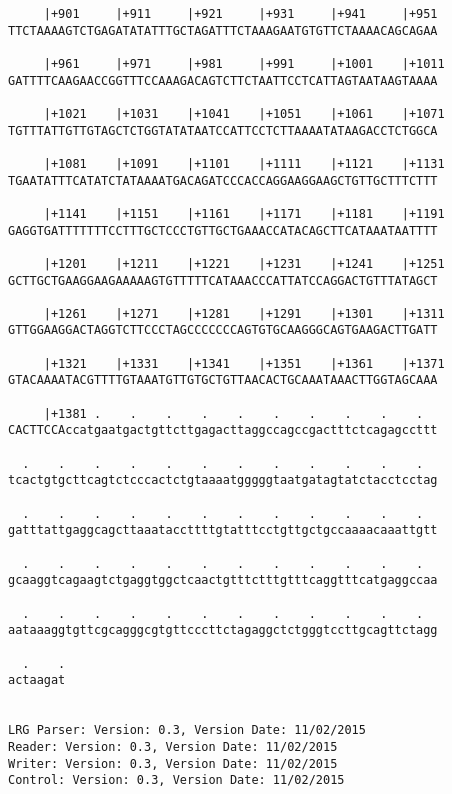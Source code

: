 \documentclass{article}
\begin{document}
\begin{Verbatim}
     |+901     |+911     |+921     |+931     |+941     |+951
TTCTAAAAGTCTGAGATATATTTGCTAGATTTCTAAAGAATGTGTTCTAAAACAGCAGAA
                                                            
     |+961     |+971     |+981     |+991     |+1001    |+1011
GATTTTCAAGAACCGGTTTCCAAAGACAGTCTTCTAATTCCTCATTAGTAATAAGTAAAA
                                                            
     |+1021    |+1031    |+1041    |+1051    |+1061    |+1071
TGTTTATTGTTGTAGCTCTGGTATATAATCCATTCCTCTTAAAATATAAGACCTCTGGCA
                                                            
     |+1081    |+1091    |+1101    |+1111    |+1121    |+1131
TGAATATTTCATATCTATAAAATGACAGATCCCACCAGGAAGGAAGCTGTTGCTTTCTTT
                                                            
     |+1141    |+1151    |+1161    |+1171    |+1181    |+1191
GAGGTGATTTTTTTCCTTTGCTCCCTGTTGCTGAAACCATACAGCTTCATAAATAATTTT
                                                            
     |+1201    |+1211    |+1221    |+1231    |+1241    |+1251
GCTTGCTGAAGGAAGAAAAAGTGTTTTTCATAAACCCATTATCCAGGACTGTTTATAGCT
                                                            
     |+1261    |+1271    |+1281    |+1291    |+1301    |+1311
GTTGGAAGGACTAGGTCTTCCCTAGCCCCCCCAGTGTGCAAGGGCAGTGAAGACTTGATT
                                                            
     |+1321    |+1331    |+1341    |+1351    |+1361    |+1371
GTACAAAATACGTTTTGTAAATGTTGTGCTGTTAACACTGCAAATAAACTTGGTAGCAAA
                                                            
     |+1381 .    .    .    .    .    .    .    .    .    .  
CACTTCCAccatgaatgactgttcttgagacttaggccagccgactttctcagagccttt
                                                            
  .    .    .    .    .    .    .    .    .    .    .    .  
tcactgtgcttcagtctcccactctgtaaaatgggggtaatgatagtatctacctcctag
                                                            
  .    .    .    .    .    .    .    .    .    .    .    .  
gatttattgaggcagcttaaataccttttgtatttcctgttgctgccaaaacaaattgtt
                                                            
  .    .    .    .    .    .    .    .    .    .    .    .  
gcaaggtcagaagtctgaggtggctcaactgtttctttgtttcaggtttcatgaggccaa
                                                            
  .    .    .    .    .    .    .    .    .    .    .    .  
aataaaggtgttcgcagggcgtgttcccttctagaggctctgggtccttgcagttctagg
                                                            
  .    .
actaagat
        
        
LRG Parser: Version: 0.3, Version Date: 11/02/2015
Reader: Version: 0.3, Version Date: 11/02/2015
Writer: Version: 0.3, Version Date: 11/02/2015
Control: Version: 0.3, Version Date: 11/02/2015
\end{Verbatim}
\end{document}

